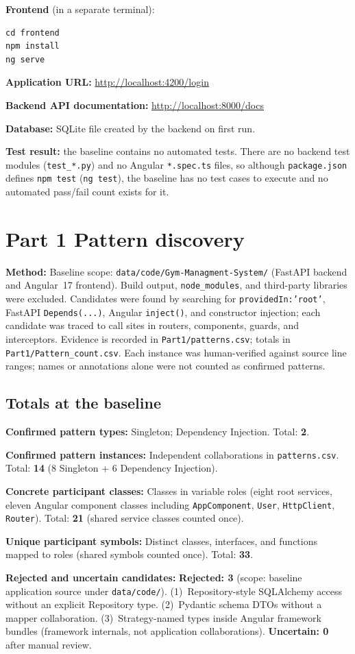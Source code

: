 \documentclass[11pt,a4paper]{article}
\newcommand{\filledentry}[2]{\textbf{#1:} #2\par}
\begin{document}
\textbf{Frontend} (in a separate terminal):
\begin{verbatim}
cd frontend
npm install
ng serve
\end{verbatim}

\textbf{Application URL:} \url{http://localhost:4200/login}\par
\textbf{Backend API documentation:} \url{http://localhost:8000/docs}\par
\textbf{Database:} SQLite file created by the backend on first run.

\textbf{Test result:} the baseline contains no automated tests. There are no backend test modules (\texttt{test\_*.py}) and no Angular \texttt{*.spec.ts} files, so although \texttt{package.json} defines \texttt{npm test} (\texttt{ng test}), the baseline has no test cases to execute and no automated pass/fail count exists for it.\par

\section{Part 1 Pattern discovery}

\filledentry{Method}{%
Baseline scope: \texttt{data/code/Gym-Managment-System/} (FastAPI backend and Angular~17 frontend).
Build output, \texttt{node\_modules}, and third-party libraries were excluded.
Candidates were found by searching for \texttt{providedIn:'root'}, FastAPI \texttt{Depends(...)}, Angular \texttt{inject()}, and constructor injection; each candidate was traced to call sites in routers, components, guards, and interceptors.
Evidence is recorded in \texttt{Part1/patterns.csv}; totals in \texttt{Part1/Pattern\_count.csv}.
Each instance was human-verified against source line ranges; names or annotations alone were not counted as confirmed patterns.
}

\subsection{Totals at the baseline}

\filledentry{Confirmed pattern types}{Singleton; Dependency Injection. Total: \textbf{2}.}
\filledentry{Confirmed pattern instances}{Independent collaborations in \texttt{patterns.csv}. Total: \textbf{14} (8 Singleton + 6 Dependency Injection).}
\filledentry{Concrete participant classes}{Classes in variable roles (eight root services, eleven Angular component classes including \texttt{AppComponent}, \texttt{User}, \texttt{HttpClient}, \texttt{Router}). Total: \textbf{21} (shared service classes counted once).}
\filledentry{Unique participant symbols}{Distinct classes, interfaces, and functions mapped to roles (shared symbols counted once). Total: \textbf{33}.}
\filledentry{Rejected and uncertain candidates}{%
\textbf{Rejected: 3} (scope: baseline application source under \texttt{data/code/}).
(1)~Repository-style SQLAlchemy access without an explicit Repository type.
(2)~Pydantic schema DTOs without a mapper collaboration.
(3)~Strategy-named types inside Angular framework bundles (framework internals, not application collaborations).
\textbf{Uncertain: 0} after manual review.
}
\end{document}

